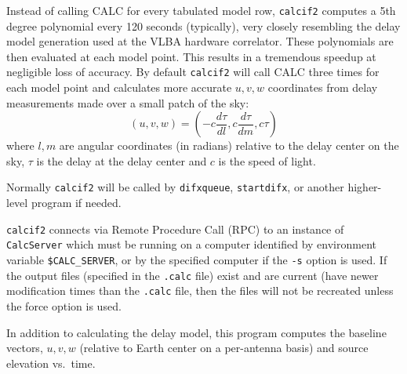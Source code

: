 Instead of calling CALC for every tabulated model row, {\tt calcif2} computes a 5th degree polynomial every 120 seconds (typically),
very closely resembling the delay model generation used at the VLBA hardware correlator.
These polynomials are then evaluated at each model point.
This results in a tremendous speedup at negligible loss of accuracy.
By default {\tt calcif2} will call CALC three times for each model point and calculates more accurate $u, v, w$ coordinates from delay measurements made over a small patch of the sky:
\begin{equation}
(u, v, w) = \left(-c \frac{d \tau}{d l}, c \frac{d \tau}{d m}, c \tau \right)
\end{equation}
where $l, m$ are angular coordinates (in radians) relative to the delay center on the sky, $\tau$ is the delay at the delay center and $c$ is the speed of light.

Normally {\tt calcif2} will be called by {\tt difxqueue}, {\tt startdifx}, or another higher-level program if needed.

{\tt calcif2} connects via Remote Procedure Call (RPC) to an instance of {\tt CalcServer} which must be running on a computer identified by environment variable {\tt \$CALC\_SERVER}, or by the specified computer if the {\tt -s} option is used.
If the output files (specified in the {\tt .calc} file) exist and are current (have newer modification times than the {\tt .calc} file, then the files will not be recreated unless the force option is used.

In addition to calculating the delay model, this program computes the baseline vectors, $u,v,w$ (relative to Earth center on a per-antenna basis) and source elevation vs.\ time.

